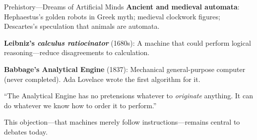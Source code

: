 ﻿\documentclass[aspectratio=169,11pt]{beamer}
\begin{document}
\begin{frame}{Prehistory---Dreams of Artificial Minds}
\textbf{Ancient and medieval automata}: Hephaestus's golden robots in Greek myth; medieval clockwork figures; Descartes's speculation that animals are automata.

\vspace{0.3em}
\textbf{Leibniz's \emph{calculus ratiocinator}} (1680s): A machine that could perform logical reasoning---reduce disagreements to calculation.

\vspace{0.3em}
\textbf{Babbage's Analytical Engine} (1837): Mechanical general-purpose computer (never completed). Ada Lovelace wrote the first algorithm for it.

\vspace{0.3em}
\begin{casestudybox}
\small
``The Analytical Engine has no pretensions whatever to \emph{originate} anything. It can do whatever we know how to order it to perform.''
\end{casestudybox}

This objection---that machines merely follow instructions---remains central to debates today.
\end{frame}
\end{document}

